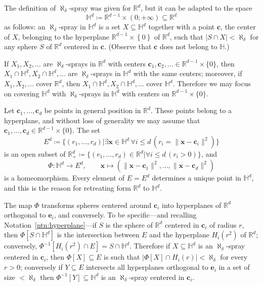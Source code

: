 \documentclass[12pt]{amsart}
\newcommand{\FORALL}[1]{\forall {#1} \, }
\newcommand{\EXISTS}[1]{\exists {#1} \, }
\newcommand{\R}{\mathbb{R}}	%
\newcommand{\Mid}{\boldsymbol\mid}			%
\newcommand{\set}[1]{\mathopen \{ {#1} \mathclose \}} %
\newcommand{\setof}[2]{\mathopen \{{#1}\Mid{#2} \mathclose\}} %
\newcommand{\setLR}[1]{\left \{ {#1} \right \}} %
\newcommand{\card}[1]{\mathopen | #1 \mathclose |}		%
\theoremstyle{plain}
\theoremstyle{definition}
\theoremstyle{remark}
\begin{document}
The definition of \( \aleph_ \delta \)-spray was given for \( \R^d \), but it can be adapted to the space 
\[
 \mathbb{H}^d \coloneqq \R^{d - 1} \times ( 0 ; + \infty ) \subseteq \R^d
\]
as follows: an \( \aleph_ \delta \)-spray in \( \mathbb{H}^d \) is a set \( X \subseteq \mathbb{H}^d \) together with a point \( \mathbf{c} \), the center of \( X \), belonging to the hyperplane \( \R^{ d - 1} \times \setLR{0} \) of \( \R^d \), such that \( \card{ S \cap X } < \aleph_ \delta \) for any sphere \( S \) of \( \R^d \) centered in \( \mathbf{c} \).
(Observe that \( \mathbf{c} \) does not belong to \( \mathbb{H} \).)

If \( X_1 , X_2 , \dots \) are \( \aleph_ \delta \)-sprays in \( \R^d \) with centers \( \mathbf{c}_1 , \mathbf{c}_2 , \ldots \in \R^{d - 1} \times \set{0} \), then \( X_1 \cap \mathbb{H}^d , X_2 \cap \mathbb{H}^d , \dots \) are \( \aleph_ \delta \)-sprays in \( \mathbb{H}^d \) with the same centers; moreover, if \( X_1 , X_2 , \dots \) cover \( \R^d \), then \( X_1 \cap \mathbb{H}^d , X_2 \cap \mathbb{H}^d , \dots \) cover \( \mathbb{H}^d \).
Therefore we may focus on covering \( \mathbb{H}^d \) with \( \aleph_ \delta \)-sprays in \( \mathbb{H}^d \) with centers on \( \R^{ d - 1 } \times \set{0} \).

Let \( \mathbf{c}_1 , \dots , \mathbf{c}_d \) be points in general position in \( \R^d \).
These points belong to a hyperplane, and without loss of generality we may assume that \( \mathbf{c}_1 , \dots , \mathbf{c}_d \in \R^{ d - 1 } \times \set{0} \).
The set 
\[
 E^d \coloneqq \setof{ ( r_1 , \dots , r_d ) }{ \EXISTS{ \mathbf{x} \in \mathbb{H}^d } \FORALL{i \leq d} ( r_i = \| \mathbf{x} - \mathbf{c}_i \|^2 ) } 
\]
is an open subset of \( \R^d_+ \coloneqq \setof{ ( r_1 , \dots , r_d ) \in \R^d }{ \FORALL{i \leq d} ( r_i > 0 )} \), and 
\begin{equation}\label{eq:Phi}
\Phi \colon \mathbb{H}^d \to E^d , \qquad \mathbf{x} \mapsto ( \| \mathbf{x} - \mathbf{c}_1 \|^2 , \dots , \| \mathbf{x} - \mathbf{c}_d \|^2 ) 
\end{equation}
is a homeomorphism.
Every element of \( E = E^d \) determines a unique point in \( \mathbb{H}^d \), and this is the reason for retreating form \( \R^d \) to \( \mathbb{H}^d \).

The map \( \Phi \) transforms spheres centered around \( \mathbf{c}_i \) into hyperplanes of \( \R^d \) orthogonal to \( \mathbf{e}_i \), and conversely. 
To be specific---and recalling Notation~\ref{ntn:hyperplane}---if \( S \) is the sphere of \( \R^d \) centered in \( \mathbf{c}_i \) of radius \( r \), then \( \Phi [ S \cap \mathbb{H}^d ] \) is the intersection between \( E \) and the hyperplane \( H_i ( r^2 ) \) of \( \R^d \); conversely, \( \Phi^{-1} [ H_i ( r^2 ) \cap E ] = S \cap \mathbb{H}^d \).
Therefore if \( X \subseteq \mathbb{H}^d \) is an \( \aleph_ \delta \)-spray centered in \( \mathbf{c}_i \), then \( \Phi [ X ] \subseteq E \) is such that \( \card{ \Phi [ X ] \cap H_i ( r ) } < \aleph_ \delta \) for every \( r > 0 \); conversely if \( Y \subseteq E \) intersects all hyperplanes orthogonal to \( \mathbf{e}_i \) in a set of size \( < \aleph_ \delta \) then \( \Phi ^{- 1 } [ Y ] \subseteq \mathbb{H}^d \) is an \( \aleph_ \delta \)-spray centered in \( \mathbf{c}_i \).
\end{document}

